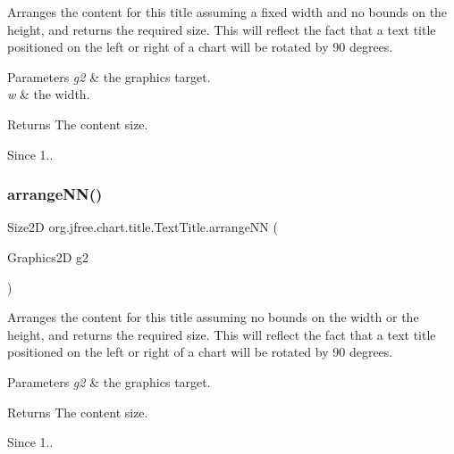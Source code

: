 Arranges the content for this title assuming a fixed width and no bounds on the height, and returns the required size. This will reflect the fact that a text title positioned on the left or right of a chart will be rotated by 90 degrees.


\begin{DoxyParams}{Parameters}
{\em g2} & the graphics target. \\
\hline
{\em w} & the width.\\
\hline
\end{DoxyParams}
\begin{DoxyReturn}{Returns}
The content size.
\end{DoxyReturn}
\begin{DoxySince}{Since}
1.. 
\end{DoxySince}
\mbox{\label{classorg_1_1jfree_1_1chart_1_1title_1_1_text_title_a7620f4432e8583f72d79851feda5c715}} 
\subsubsection{\texorpdfstring{arrange\+N\+N()}{arrangeNN()}}
{\footnotesize\ttfamily Size2D org.\+jfree.\+chart.\+title.\+Text\+Title.\+arrange\+NN (\begin{DoxyParamCaption}\item[{Graphics2D}]{g2 }\end{DoxyParamCaption})\hspace{0.3cm}{\ttfamily [protected]}}

Arranges the content for this title assuming no bounds on the width or the height, and returns the required size. This will reflect the fact that a text title positioned on the left or right of a chart will be rotated by 90 degrees.


\begin{DoxyParams}{Parameters}
{\em g2} & the graphics target.\\
\hline
\end{DoxyParams}
\begin{DoxyReturn}{Returns}
The content size.
\end{DoxyReturn}
\begin{DoxySince}{Since}
1.. 
\end{DoxySince}
\mbox{\label{classorg_1_1jfree_1_1chart_1_1title_1_1_text_title_a3d2d56e3d3cbd557e9aec25f0e230a4f}} 

